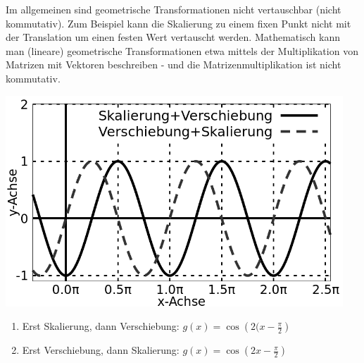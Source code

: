 \item Im allgemeinen sind geometrische Transformationen nicht vertauschbar (nicht kommutativ). Zum Beispiel kann die Skalierung zu einem fixen Punkt nicht mit der Translation um einen festen Wert vertauscht werden. Mathematisch kann man (lineare) geometrische Transformationen etwa mittels der Multiplikation von Matrizen mit Vektoren beschreiben - und die Matrizenmultiplikation ist nicht kommutativ.

\begin{center}
\includegraphics[width=0.95\textwidth]{../pool/ex-fn-transform-4-a.png}
\end{center}

\begin{enumerate}
\item Erst Skalierung, dann Verschiebung: $g(x) = \cos\left(2(x-\frac{\pi}{2}\right)$
\item Erst Verschiebung, dann Skalierung: $g(x) = \cos\left(2x-\frac{\pi}{2}\right)$
\end{enumerate}
